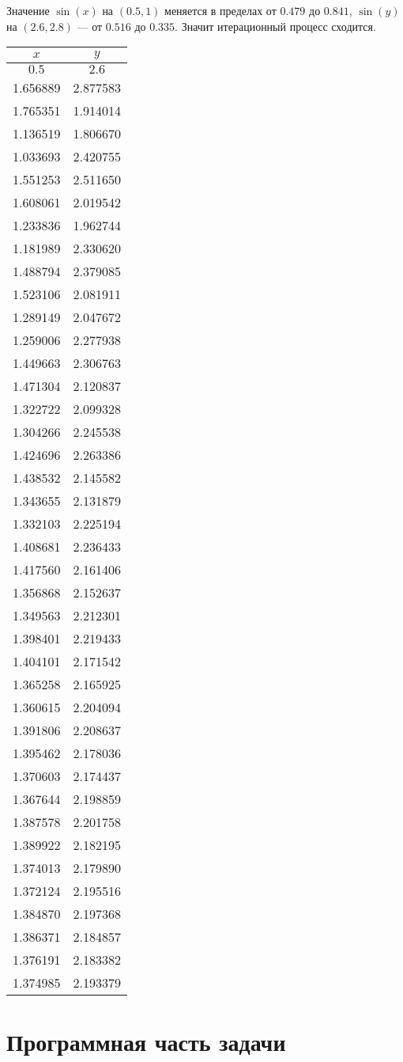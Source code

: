 Значение \(\sin(x)\) на \((0.5, 1)\) меняется в пределах от \(0.479\) до $0.841$,
\(\sin(y)\) на $(2.6, 2.8)$ --- от $0.516$ до $0.335$.
Значит итерационный процесс сходится.

\begin{table}[H]
  \centering
	\begin{tabular}{|c | c|}
		\hline
		$x$      & $y$      \\
		\hline
		$0.5$    & $2.6$    \\
		1.656889 & 2.877583 \\
		1.765351 & 1.914014 \\
		1.136519 & 1.806670 \\
		1.033693 & 2.420755 \\
		1.551253 & 2.511650 \\
		1.608061 & 2.019542 \\
		1.233836 & 1.962744 \\
		1.181989 & 2.330620 \\
		1.488794 & 2.379085 \\
		1.523106 & 2.081911 \\
		1.289149 & 2.047672 \\
		1.259006 & 2.277938 \\
		1.449663 & 2.306763 \\
		1.471304 & 2.120837 \\
		1.322722 & 2.099328 \\
		1.304266 & 2.245538 \\
		1.424696 & 2.263386 \\
		1.438532 & 2.145582 \\
		1.343655 & 2.131879 \\
		1.332103 & 2.225194 \\
		1.408681 & 2.236433 \\
		1.417560 & 2.161406 \\
		1.356868 & 2.152637 \\
		1.349563 & 2.212301 \\
		1.398401 & 2.219433 \\
		1.404101 & 2.171542 \\
		1.365258 & 2.165925 \\
		1.360615 & 2.204094 \\
		1.391806 & 2.208637 \\
		1.395462 & 2.178036 \\
		1.370603 & 2.174437 \\
		1.367644 & 2.198859 \\
		1.387578 & 2.201758 \\
		1.389922 & 2.182195 \\
		1.374013 & 2.179890 \\
		1.372124 & 2.195516 \\
		1.384870 & 2.197368 \\
		1.386371 & 2.184857 \\
		1.376191 & 2.183382 \\
		1.374985 & 2.193379 \\
		\hline
	\end{tabular}
\end{table}

\section{Программная часть задачи}
